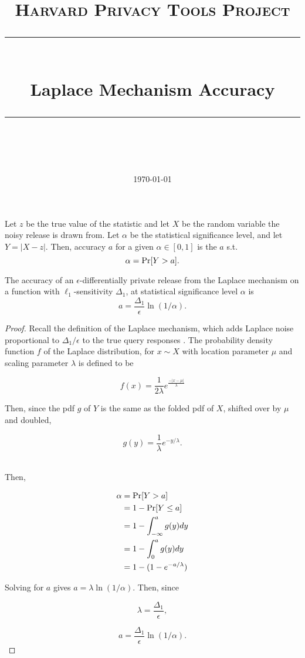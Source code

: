 \documentclass[11pt]{scrartcl} %
\title{
	\normalfont\normalsize
	\textsc{Harvard Privacy Tools Project}\\ %
	\vspace{25pt} %
	\rule{\linewidth}{0.5pt}\\ %
	\vspace{20pt} %
	{\huge Laplace Mechanism Accuracy}\\ %
	\vspace{12pt} %
	\rule{\linewidth}{2pt}\\ %
	\vspace{12pt} %
}
\date{\normalsize\today} %
\begin{document}
\maketitle


\begin{definition}
Let $z$ be the true value of the statistic and let $X$ be the random variable the noisy release is drawn from. Let $\alpha$ be the statistical significance level, and let $Y = \vert X-z \vert.$ Then, accuracy $a$ for a given $\alpha \in [0,1]$ is the $a$ s.t.
$$ \alpha = \text{Pr}[Y > a].$$
\end{definition}

\begin{theorem}
The accuracy of an $\epsilon$-differentially private release from the Laplace mechanism on a function with $\ell_1$-sensitivity $\Delta_1$, at statistical significance level $\alpha$ is
$$ a = \frac{\Delta_1}{\epsilon}\ln(1/\alpha).$$
\end{theorem}

\begin{proof}
Recall the definition of the Laplace mechanism, which adds Laplace noise proportional to $\Delta_1/\epsilon$ to the true query responses \cite{DMNS06}. The probability density function $f$ of the Laplace distribution, for $x \sim X$ with location parameter $\mu$ and scaling parameter $\lambda$ is defined to be

$$ f(x) = \frac{1}{2\lambda}e^{\frac{-\vert x-\mu \vert}{ \lambda}}$$

Then, since the pdf $g$ of $Y$ is the same as the folded pdf of $X$, shifted over by $\mu$ and doubled,

$$ g(y) = \frac{1}{\lambda}e^{-y/\lambda}.$$\

Then, 

\begin{align*}
\alpha &= \text{Pr}[Y>a] \\
	&= 1 - \text{Pr}[Y\le a]\\
	&= 1 - \int_{-\infty}^a g(y) dy \\
	&= 1 - \int_0^a g(y) dy \\
	&= 1 - (1-e^{-a/\lambda})
\end{align*}

Solving for $a$ gives $a = \lambda \ln (1/\alpha)$. Then, since 

$$\lambda = \frac{\Delta_1}{\epsilon},$$

$$ a = \frac{\Delta_1}{\epsilon}\ln(1/\alpha).$$
\end{proof}



\end{document}
